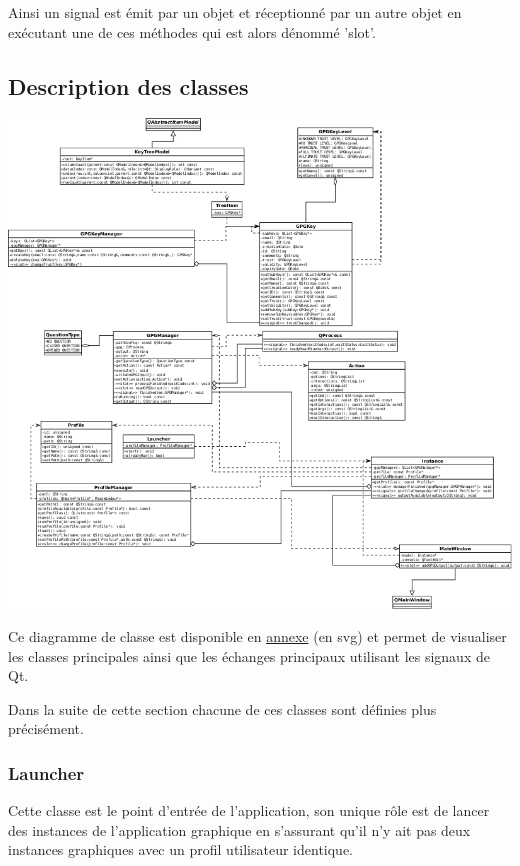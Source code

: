 \documentclass{../res/univ-projet}
\begin{document}
    Ainsi un signal est émit par un objet et réceptionné par un autre objet en exécutant une de ces méthodes
    qui est alors dénommé 'slot'.

  \subsection{Description des classes} %
      
    \begin{center}
    \includegraphics[scale=.5]{graphics/diagramme-classes.png}
    
    Ce diagramme de classe est disponible en \href{graphics/diagramme-classes.svg}{annexe} (en svg)
    et permet de visualiser les classes principales ainsi que les échanges principaux utilisant
    les signaux de Qt.
    \end{center}

      Dans la suite de cette section chacune de ces classes sont définies plus précisément.

      \subsubsection{Launcher}

        Cette classe est le point d'entrée de l'application, son unique rôle est de lancer des instances de l'application
        graphique en s'assurant qu'il n'y ait pas deux instances graphiques avec un profil utilisateur
        identique.
        
\end{document}

